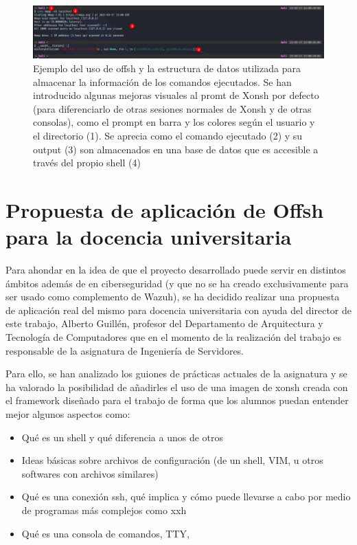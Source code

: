 \begin{figure}[!hbt]
  \centering
  \includegraphics[width=\textwidth]{imagenes/offsh.png}
  \caption{Ejemplo del uso de offsh y la estructura de datos utilizada para almacenar la información de los comandos ejecutados. Se han introducido algunas mejoras visuales al promt de Xonsh por defecto (para diferenciarlo de otras sesiones normales de Xonsh y de otras consolas), como el prompt en barra y los colores según el usuario y el directorio (1). Se aprecia como el comando ejecutado (2) y su output (3) son almacenados en una base de datos que es accesible a través del propio shell (4)}
  \label{examplexonsh}
\end{figure}


\section{Propuesta de aplicación de Offsh para la docencia universitaria}

Para ahondar en la idea de que el proyecto desarrollado puede servir en distintos ámbitos además de en ciberseguridad (y que no se ha creado exclusivamente para ser usado como complemento de Wazuh), se ha decidido realizar una propuesta de aplicación real del mismo para docencia universitaria con ayuda del director de este trabajo, Alberto Guillén, profesor del Departamento de Arquitectura y Tecnología de Computadores que en el momento de la realización del trabajo es responsable de la asignatura de Ingeniería de Servidores.

Para ello, se han analizado los guiones de prácticas actuales de la asignatura y se ha valorado la posibilidad de añadirles el uso de una imagen de xonsh creada con el framework diseñado para el trabajo de forma que los alumnos puedan entender mejor algunos aspectos como:

\begin{itemize}
    \item Qué es un shell y qué diferencia a unos de otros
    \item Ideas básicas sobre archivos de configuración (de un shell, VIM, u otros softwares con archivos similares)
    \item Qué es una conexión ssh, qué implica y cómo puede llevarse a cabo por medio de programas más complejos como xxh
    \item Qué es una consola de comandos, TTY, 
\end{itemize}

